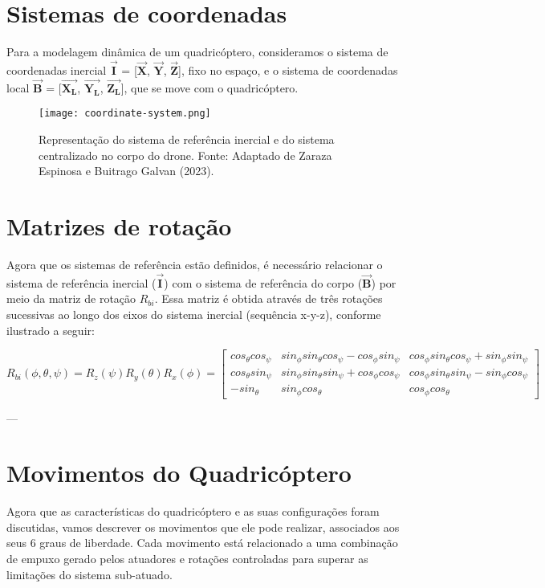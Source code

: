 \section{Sistemas de coordenadas}
Para a modelagem dinâmica de um quadricóptero, consideramos o sistema de coordenadas inercial $\boldsymbol{\vec{I}}$ = [$\boldsymbol{\vec{X}}$, $\boldsymbol{\vec{Y}}$, $\boldsymbol{\vec{Z}}$], fixo no espaço, e o sistema de coordenadas local $\boldsymbol{\vec{B}}$ = [$\boldsymbol{\vec{X_L}}$, $\boldsymbol{\vec{Y_L}}$, $\boldsymbol{\vec{Z_L}}$], que se move com o quadricóptero.

\begin{figure}[H]
	\centering
	\texttt{[image: coordinate-system.png]}
	\caption{Representação do sistema de referência inercial e do sistema centralizado no corpo do drone. Fonte: Adaptado de Zaraza Espinosa e Buitrago Galvan (2023).}
	\centering
	\label{fig:coordinate-system}
\end{figure}

\section{Matrizes de rotação}
Agora que os sistemas de referência estão definidos, é necessário relacionar o sistema de referência inercial ($\boldsymbol{\vec{I}}$) com o sistema de referência do corpo ($\boldsymbol{\vec{B}}$) por meio da matriz de rotação $R_{bi}$. Essa matriz é obtida através de três rotações sucessivas ao longo dos eixos do sistema inercial (sequência x-y-z), conforme ilustrado a seguir:

\begin{equation}
	R_{bi}(\phi,\theta,\psi) = R_z(\psi) R_y(\theta) R_x(\phi) =
	\begin{bmatrix}
		cos_\theta cos_\psi & sin_\phi sin_\theta cos_\psi - cos_\phi sin_\psi & cos_\phi sin_\theta cos_\psi + sin_\phi sin_\psi \\
		cos_\theta sin_\psi & sin_\phi sin_\theta sin_\psi + cos_\phi cos_\psi & cos_\phi sin_\theta sin_\psi - sin_\phi cos_\psi \\
		-sin_\theta         & sin_\phi cos_\theta                              & cos_\phi cos_\theta
	\end{bmatrix}
\end{equation}

---

\section{Movimentos do Quadricóptero}
Agora que as características do quadricóptero e as suas configurações foram discutidas, vamos descrever os movimentos que ele pode realizar, associados aos seus 6 graus de liberdade. Cada movimento está relacionado a uma combinação de empuxo gerado pelos atuadores e rotações controladas para superar as limitações do sistema sub-atuado.

